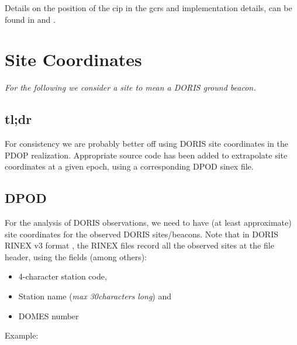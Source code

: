 Details on the position of the \gls{cip} in the \gls{gcrs} and implementation 
details, can be found in \cite{CapitaineAndWallace2006} and 
\cite{Capitaineetal2003a}.

\section{Site Coordinates}
\label{sec:site-coordinates}

\emph{For the following we consider a site to mean a DORIS ground beacon.}

\subsection{tl;dr}
For consistency we are probably better off using DORIS site coordinates in the 
PDOP realization. Appropriate source code has been added to extrapolate site 
coordinates at a given epoch, using a corresponding DPOD \gls{sinex} file.


\subsection{DPOD}
\label{ssec:pdop}
For the analysis of DORIS observations, we need to have (at least approximate) 
site coordinates for the observed DORIS sites/beacons. Note that in DORIS RINEX 
v3 format \cite{DORISRNX3}, the RINEX files record all the observed sites at the 
file header, using the fields (among others):
\begin{itemize}
    \item 4-character station code,
    \item Station name (\textit{max 30characters long}) and 
    \item DOMES number
\end{itemize}

Example:

